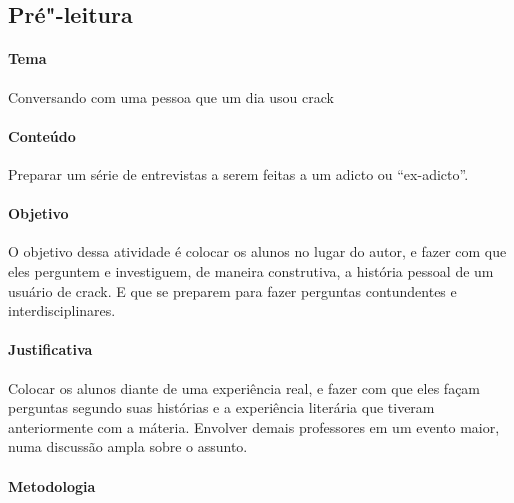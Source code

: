\documentclass[12pt]{extarticle}
\begin{document}


\subsection{Pré"-leitura}

\paragraph{Tema} Conversando com uma pessoa que um dia usou crack

\paragraph{Conteúdo} Preparar um série de entrevistas a serem feitas a um
	adicto ou ``ex-adicto''. 

\paragraph{Objetivo} O objetivo dessa atividade é colocar os alunos no lugar 
	do autor, e fazer com que eles perguntem e investiguem, de maneira construtiva, 
	a história pessoal de um usuário de crack. E que se preparem 
	para fazer perguntas contundentes e interdisciplinares. 

\paragraph{Justificativa} Colocar os alunos diante de uma experiência real, 
	e fazer com que eles façam perguntas segundo suas histórias e a experiência
	literária que tiveram anteriormente com a máteria. Envolver demais 
	professores em um evento maior, numa discussão ampla sobre o assunto. 

\paragraph{Metodologia}
\end{document}
